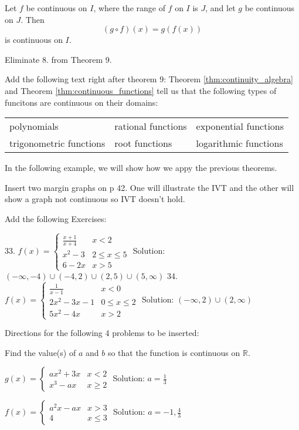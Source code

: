 \documentclass[10pt]{article}
\newcommand{\ds}{\displaystyle}
\begin{document}
Let $f$ be continuous on $I$, where the range of $f$ on $I$ is $J$, and let $g$ be continuous on $J$. Then $$ (g\circ f)(x)=g(f(x))$$ is continuous on $I$.

Eliminate 8. from Theorem 9.

Add the following text right after theorem 9:     Theorem \ref{thm:continuity_algebra} and Theorem \ref{thm:continuous_functions} tell us that the following types of funcitons are continuous on their domains: 
\begin{center}
\begin{tabular}{l l l}
polynomials& rational functions&exponential functions\\
trigonometric functions &  root functions& logarithmic functions
\end{tabular}
\end{center}
In the following example, we will show how we appy the previous theorems.

Insert two margin graphs on p 42. One will illustrate the IVT and the other will show a graph not continuous so IVT doesn't hold.

Add the following Exercises:


33. 
$\ds f(x) = \begin{cases} 
\frac{x+1}{x+4} & x<2\\ x^2-3 &2\leq x\leq 5 \\ 6-2x & x>5\end{cases}$
Solution: $(-\infty,-4)\cup (-4,2)\cup (2,5)\cup (5,\infty)$
34.
$\ds f(x) = \begin{cases} 
\frac{1}{x-1} & x<0\\ 2x^2-3x-1 &0\leq x\leq 2 \\ 5x^2-4x & x>2\end{cases}$
Solution: $(-\infty, 2)\cup(2,\infty)$

Directions for the following 4 problems to be inserted: 

Find the value(s) of $a$ and $b$ so that the function is continuous on $\mathbb{R}$.  %

$\ds g(x)= \begin{cases} 
ax^2+3x & x<2\\
x^3-ax & x\geq 2\end{cases}$			Solution: $a=\frac{1}{3}$

$\ds f(x)= \begin{cases} 
a^2x-ax & x>3\\
4& x\leq 3 \end{cases}$			Solution: $a=-1,\frac{4}{3}$
\end{document}
